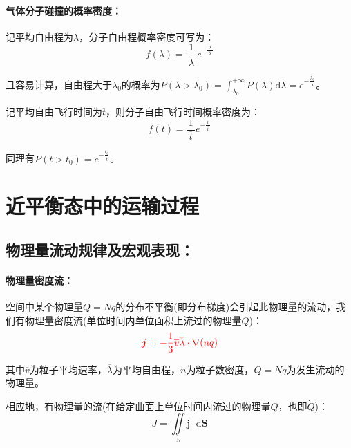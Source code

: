 \documentclass[zihao=-4,UTF8]{report}
\begin{document}
\subsubsection{气体分子碰撞的概率密度：}
记平均自由程为$\overline{\lambda}$，分子自由程概率密度可写为：
\begin{equation}
    f(\lambda) = \frac{1}{\ \overline{\lambda}\ }e^{-\frac{\lambda}{\ \overline{\lambda}\ }}
\end{equation}\par
且容易计算，自由程大于$\lambda_0$的概率为$P(\lambda >\lambda_0) = \int_{\lambda_0}^{+\infty} P(\lambda)\mathrm{d}\lambda = e^{-\frac{\lambda_0}{\ \overline{\lambda}\ }}$。\par
记平均自由飞行时间为$\overline{t}$，则分子自由飞行时间概率密度为：
\begin{equation}
    f(t) = \frac{1}{\ \overline{t}\ }e^{-\frac{t}{\ \overline{t}\ }}
\end{equation}\par
同理有$P(t>t_0) = e^{-\frac{t_0}{\ \overline{t}\ }}$。
\chapter{近平衡态中的运输过程}
\section{物理量流动规律及宏观表现：}
\subsubsection{物理量密度流：}
空间中某个物理量$Q = N q$的分布不平衡(即分布梯度)会引起此物理量的流动，我们有物理量密度流(单位时间内单位面积上流过的物理量$Q$)：
\begin{equation}
    \textcolor{red}{\boldsymbol{j}= -\frac{1}{3} \overline{v}\overline{\lambda} \cdot  \nabla (nq)}
\end{equation}\par
{\color{gray}\small 其中$\overline{v}$为粒子平均速率，$\overline{\lambda}$为平均自由程，$n$为粒子数密度，$Q = Nq$为发生流动的物理量。}\par
相应地，有物理量的流(在给定曲面上单位时间内流过的物理量$Q$，也即$\dot Q$)：
\begin{equation}
    J =  \iint\limits_{S} \boldsymbol{j}\cdot \mathrm{d}\boldsymbol{S}
\end{equation}
\end{document}
